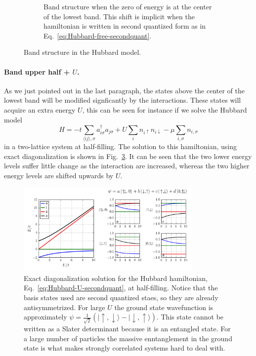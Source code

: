 \documentclass[11pt,letter]{article}
\newcommand{\spup}{\ensuremath{ \!\uparrow }}
\newcommand{\spdn}{\ensuremath{ \!\downarrow}}
\begin{document}
\begin{figure}
\begin{subfigure}[t]{0.4\textwidth}
\caption{ Band structure when the zero of energy is at the center of the lowest
band.  This shift is implicit when the hamiltonian is written in second
quantized form as in Eq.~\ref{eq:Hubbard-free-secondquant}.  }
                \label{fig:Hubbard-secondquant}
        \end{subfigure}
	\caption{ Band structure in the Hubbard model.  }
\label{fig:Hubbard-first-second}
\end{figure}

\paragraph{Band upper half + $U$. }  As we just pointed out in the last
paragraph, the states above the center of the lowest band will be modified
signficantly by the interactions.  These states will acquire an extra energy
$U$,  this can be seen for instance if we solve the Hubbard model
\begin{equation} 
  H  = -t \sum_{ \langle ij \rangle, \sigma } a_{i\sigma}^{\dagger} a_{j\sigma}
      + U \sum_{i} n_{i\spup} n_{i\spdn}  - \mu\sum_{i,\sigma} n_{ i,\sigma}
  \label{eq:Hubbard-U-secondquant}
\end{equation} 
in a two-lattice system at half-filling.  The solution to this hamiltonian,
using exact diagonalization is shown in Fig.~\ref{fig:exactdiag_2site}.  It can
be seen that the two lower energy levels suffer little change as the
interaction are increased, whereas the two higher energy levels are shifted
upwards by $U$. 
\begin{figure}
    \centering
\includegraphics[width=0.8\textwidth]{figures/Ut_eigenvalues_2site.png}
\caption{Exact diagonalization solution for the Hubbard hamiltonian,
Eq.~\ref{eq:Hubbard-U-secondquant}, at half-filling.  Notice that the basis
states used are second quantized staes, so they are already antisymmetrized.
For large $U$ the ground state wavefunction is approximately $\psi =
\frac{1}{\sqrt{2}} (|\spup,\spdn\rangle - |\spdn,\spup\rangle )$.  This state
cannot be written as a Slater determinant because it is an entangled
state.  For a large number of particles the massive enntanglement in the ground
state is what makes strongly correlated systems hard to deal with.
}\label{fig:exactdiag_2site}
\end{figure}
\end{document}
